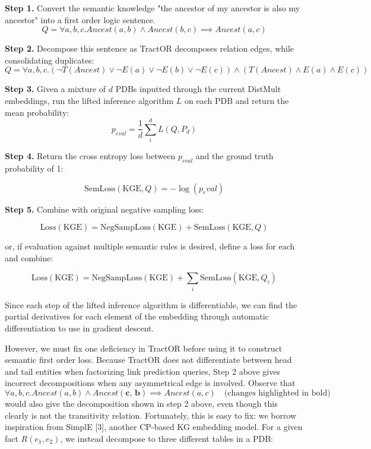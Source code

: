 \documentclass{article}
\begin{document}
\textbf{Step 1.} Convert the semantic knowledge "the ancestor of my ancestor is
also my ancestor" into a first order logic sentence. 
\[ Q = \forall a, b, c.Ancest(a, b) \land Ancest(b, c) \implies Ancest(a, c) \]

\textbf{Step 2.} Decompose this sentence as TractOR decomposes relation edges,
while consolidating duplicates:
\[ Q = \forall a, b, c.
    (\neg T(Ancest) \lor \neg E(a) \lor \neg E(b) \lor \neg E(c)) \land
(T(Ancest) \land E(a) \land E(c)) \]

\textbf{Step 3.} Given a mixture of \(d\) PDBs inputted through the current
DistMult embeddings, run the lifted inference algorithm \(L\) on each PDB and
return the mean probability:
\[ p_{eval} = \frac{1}{d} \sum_i^d L(Q, P_d) \]

\textbf{Step 4.} Return the cross entropy loss between \(p_{eval}\) and the
ground truth probability of 1:

\[ \textrm{SemLoss}(\textrm{KGE}, Q) = -\log(p_eval) \]

\textbf{Step 5.} Combine with original negative sampling loss:

\[ \textrm{Loss}(\textrm{KGE}) = \textrm{NegSampLoss}(\textrm{KGE}) 
    + \textrm{SemLoss}(\textrm{KGE}, Q) \]

or, if evaluation against multiple semantic rules is desired, define a loss for
each and combine:

\[ \textrm{Loss}(\textrm{KGE}) = \textrm{NegSampLoss}(\textrm{KGE}) 
    + \sum_i \textrm{SemLoss}(\textrm{KGE}, Q_i) \]

Since each step of the lifted inference algorithm is differentiable, we can find
the partial derivatives for each element of the embedding through automatic
differentiation to use in gradient descent.

However, we must fix one deficiency in TractOR before using it to construct
semantic first order loss. Because TractOR does not differentiate between head
and tail entities when factorizing link prediction queries, Step 2 above gives
incorrect decompositions when any asymmetrical edge is involved. Observe that 
\[ \forall a, b, c.Ancest(a, b) \land Ancest(\textbf{c, b}) \implies
Ancest(a, c) \hspace{12pt} \textrm{(changes highlighted in bold)} \]
would also give the decomposition shown in step 2 above, even though this
clearly is not the transitivity relation. Fortunately, this is easy to fix: we
borrow inspiration from SimplE [3], another CP-based KG embedding model. For a given
fact \(R(e_1, e_2)\), we instead decompose to three different tables in a PDB:
\end{document}
